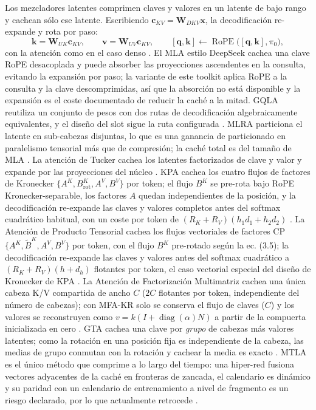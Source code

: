 Los mezcladores latentes comprimen claves y valores en un latente de bajo rango y cachean sólo ese latente. Escribiendo $\mathbf{c}_{KV} = \mathbf{W}_{DKV}\mathbf{x}$, la decodificación re-expande y rota por paso:
\[
\mathbf{k} = \mathbf{W}_{UK}\mathbf{c}_{KV},\qquad
\mathbf{v} = \mathbf{W}_{UV}\mathbf{c}_{KV},\qquad
[\mathbf{q},\mathbf{k}] \leftarrow \operatorname{RoPE}\big([\mathbf{q},\mathbf{k}], \pi_0\big),
\]
con la atención como en el caso denso \citep{mehta_mla_2025}. El MLA estilo DeepSeek cachea una clave RoPE desacoplada y puede absorber las proyecciones ascendentes en la consulta, evitando la expansión por paso; la variante de este toolkit aplica RoPE a la consulta y la clave descomprimidas, así que la absorción no está disponible y la expansión es el coste documentado de reducir la caché a la mitad. GQLA reutiliza un conjunto de pesos con dos rutas de decodificación algebraicamente equivalentes, y el diseño del slot sigue la ruta configurada \citep{meng_gqla_2026}. MLRA particiona el latente en sub-cabezas disjuntas, lo que es una ganancia de particionado en paralelismo tensorial más que de compresión; la caché total es del tamaño de MLA \citep{liu_mlra_2026}. La atención de Tucker cachea los latentes factorizados de clave y valor y expande por las proyecciones del núcleo \citep{klein_tucker_2026}. KPA cachea los cuatro flujos de factores de Kronecker $\{A^K, B^K_{\text{rot}}, A^V, B^V\}$ por token; el flujo $B^K$ se pre-rota bajo RoPE Kronecker-separable, los factores $A$ quedan independientes de la posición, y la decodificación re-expande las claves y valores completos antes del softmax cuadrático habitual, con un coste por token de $(R_K+R_V)(h_1d_1+h_2d_2)$ \citep{nikpour_kpa_2026}. La Atención de Producto Tensorial cachea los flujos vectoriales de factores CP $\{A^K, \widetilde{B}^K, A^V, B^V\}$ por token, con el flujo $B^K$ pre-rotado según la ec. (3.5); la decodificación re-expande las claves y valores antes del softmax cuadrático a $(R_K+R_V)(h+d_h)$ flotantes por token, el caso vectorial especial del diseño de Kronecker de KPA \citep{zhang_tpa_2025}. La Atención de Factorización Multimatriz cachea una única cabeza K/V compartida de ancho $C$ ($2C$ flotantes por token, independiente del número de cabezas); con MFA-KR solo se conserva el flujo de claves ($C$) y los valores se reconstruyen como $v=k(I+\operatorname{diag}(\alpha)N)$ a partir de la compuerta inicializada en cero \citep{hu_mfa_2025}. GTA cachea una clave por \emph{grupo} de cabezas más valores latentes; como la rotación en una posición fija es independiente de la cabeza, las medias de grupo conmutan con la rotación y cachear la media es exacto \citep{sun_gta_2025}. MTLA es el único método que comprime a lo largo del tiempo: una hiper-red fusiona vectores adyacentes de la caché en fronteras de zancada, el calendario es dinámico y su paridad con un calendario de entrenamiento a nivel de fragmento es un riesgo declarado, por lo que actualmente retrocede \citep{deng_mtla_2025}.


